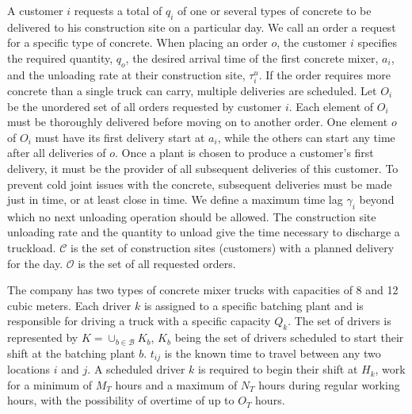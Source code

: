 \documentclass{article}
\begin{document}
A customer $i$ requests a total of $q_i$ of one or several types of concrete to be delivered to his construction site on a particular day.  We call an order a request for a specific type of concrete. When placing an order $o$, the customer $i$ specifies the required quantity, $q_o$, the desired arrival time of the first concrete mixer, $a_i$, and the unloading rate at their construction site, $\tau^u_i$. If the order requires more concrete than a single truck can carry, multiple deliveries are scheduled. Let $O_i$ be the unordered set of all orders requested by customer $i$. Each element of $O_i$ must be thoroughly delivered before moving on to another order. One element $o$ of $O_i$ must have its first delivery start at $a_i$, while the others can start any time after all deliveries of $o$. Once a plant is chosen to produce a customer's first delivery, it must be the provider of all subsequent deliveries of this customer. To prevent cold joint issues with the concrete, subsequent deliveries must be made just in time, or at least close in time. We define a maximum time lag $\gamma_i$ beyond which no next unloading operation should be allowed. The construction site unloading rate and the quantity to unload give the time necessary to discharge a truckload. $\mathcal{C}$ is the set of construction sites (customers) with a planned delivery for the day. $\mathcal{O}$ is the set of all requested orders. 


The company has two types of concrete mixer trucks with capacities of 8 and 12 cubic meters. Each driver $k$ is assigned to a specific batching plant and is responsible for driving a truck with a specific capacity $Q_k$. The set of drivers is represented by $K =\cup_{b \in \mathcal{B}}K_b $, $K_b$ being the set of drivers scheduled to start their shift at the batching plant $b$. $t_{ij}$ is the known time to travel between any two locations $i$ and $j$.
A scheduled driver $k$ is required to begin their shift at $H_k$, work for a minimum of $M_T$ hours and a maximum of $N_T$ hours during regular working hours, with the possibility of overtime of up to $O_T$ hours. %
\end{document}
